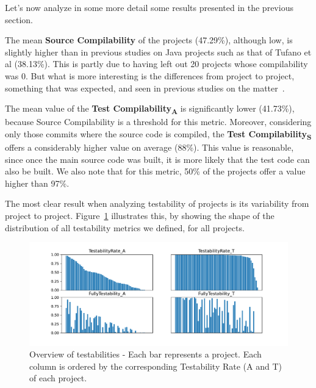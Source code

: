 Let's now analyze in some more detail some results presented in the previous section.

The mean \textbf{Source Compilability} of the projects (47.29\%), although low, is slightly higher than in previous studies on Java projects such as that of Tufano et al (38.13\%). 
This is partly due to having left out 20 projects whose compilability was 0.
But what is more interesting is the differences from project to project, something that was expected, and seen in previous studies on the matter~\cite{tufano2017there,sulir2020large,querel:2021:warning}.

The mean value of the \textbf{Test Compilability\textsubscript{A}} is significantly lower (41.73\%), because Source Compilability is a threshold for this metric.
Moreover, considering only those commits where the source code is compiled, the \textbf{Test Compilability\textsubscript{S}} offers a considerably higher value on average (88\%).
This value is reasonable, since once the main source code was built, it is more likely that the test code can also be built. 
We also note that for this metric, 50\% of the projects offer a value higher than 97\%.



The most clear result when analyzing testability of projects is its variability from project to project. 
Figure~\ref{fig:testability-overview} illustrates this, by showing the shape of the distribution of all testability metrics we defined, for all projects.

\begin{figure}[ht!]
    \centering    
    \includegraphics[width=\textwidth]{pages/02-Testability/images/Overview.pdf}
    \caption{Overview of testabilities - Each bar represents a project. Each column is ordered by the corresponding Testability Rate (A and T) of each project.}
    \label{fig:testability-overview}
\end{figure}

